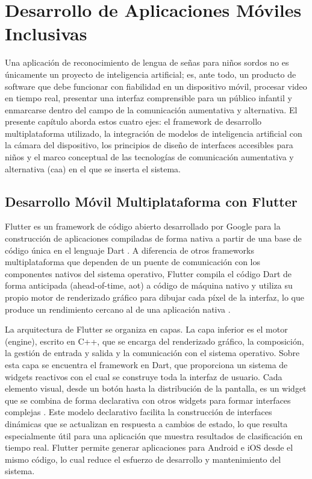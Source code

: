 \chapter{Desarrollo de Aplicaciones Móviles Inclusivas}
\label{cp:aplicaciones-moviles}

\insertminitoc
\parindent0pt

Una aplicación de reconocimiento de lengua de señas para niños sordos no es únicamente
un proyecto de inteligencia artificial; es, ante todo, un producto de software que debe
funcionar con fiabilidad en un dispositivo móvil, procesar video en tiempo real, presentar
una interfaz comprensible para un público infantil y enmarcarse dentro del campo de la
comunicación aumentativa y alternativa. El presente capítulo aborda estos cuatro ejes: el
framework de desarrollo multiplataforma utilizado, la integración de modelos de
inteligencia artificial con la cámara del dispositivo, los principios de diseño de
interfaces accesibles para niños y el marco conceptual de las tecnologías de comunicación
aumentativa y alternativa (\acrshort{caa}) en el que se inserta el sistema.

\section{Desarrollo Móvil Multiplataforma con Flutter}

Flutter es un framework de código abierto desarrollado por Google para la construcción de
aplicaciones compiladas de forma nativa a partir de una base de código única en el lenguaje
Dart \cite{google_flutter_2024}. A diferencia de otros frameworks multiplataforma que
dependen de un puente de comunicación con los componentes nativos del sistema operativo,
Flutter compila el código Dart de forma anticipada (ahead-of-time, \acrshort{aot}) a código de
máquina nativo y utiliza su propio motor de renderizado gráfico para dibujar cada píxel de
la interfaz, lo que produce un rendimiento cercano al de una aplicación nativa
\cite{google_flutter_2024}.

La arquitectura de Flutter se organiza en capas. La capa inferior es el motor (engine),
escrito en C++, que se encarga del renderizado gráfico, la composición, la gestión de
entrada y salida y la comunicación con el sistema operativo. Sobre esta capa se encuentra
el framework en Dart, que proporciona un sistema de widgets reactivos con el cual se
construye toda la interfaz de usuario. Cada elemento visual, desde un botón hasta la
distribución de la pantalla, es un widget que se combina de forma declarativa con otros
widgets para formar interfaces complejas \cite{google_flutter_2024}. Este modelo
declarativo facilita la construcción de interfaces dinámicas que se actualizan en respuesta
a cambios de estado, lo que resulta especialmente útil para una aplicación que muestra
resultados de clasificación en tiempo real. Flutter permite generar aplicaciones para
Android e iOS desde el mismo código, lo cual reduce el esfuerzo de desarrollo y
mantenimiento del sistema.

